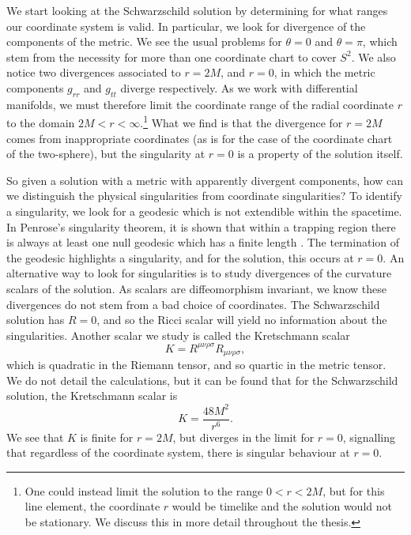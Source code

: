 We start looking at the Schwarzschild solution by determining for what ranges our coordinate system is valid. In particular, we look for divergence of the components of the metric. We see the usual problems for $\theta = 0$ and $\theta = \pi$, which stem from the necessity for more than one coordinate chart to cover $S^2$. We also notice two divergences associated to $r = 2M$, and $r = 0$, in which the metric components $g_{rr}$ and $g_{tt}$ diverge respectively. As we work with differential manifolds, we must therefore limit the coordinate range of the radial coordinate $r$ to the domain $2M < r  < \infty$.\footnote{One could instead limit the solution to the range $0 < r < 2M$, but for this line element, the coordinate $r$ would be timelike and the solution would not be stationary. We discuss this in more detail throughout the thesis.} What we find is that the divergence for $r = 2M$ comes from inappropriate coordinates (as is for the case of the coordinate chart of the two-sphere), but the singularity at $r = 0$ is a property of the solution itself.

So given a solution with a metric with apparently divergent components, how can we distinguish the physical singularities from coordinate singularities? To identify a singularity, we look for a geodesic which is not extendible within the spacetime. In Penrose's singularity theorem, it is shown that within a trapping region there is always at least one null geodesic which has a finite length \cite{Penrose:1964wq}. The termination of the geodesic highlights a singularity, and for the \sch solution, this occurs at $r = 0$. An alternative way to look for singularities is to study divergences of the curvature scalars of the solution. As scalars are diffeomorphism invariant, we know these divergences do not stem from a bad choice of coordinates. The Schwarzschild solution has $R = 0$, and so the Ricci scalar will yield no information about the singularities. Another scalar we study is called the Kretschmann scalar
\begin{equation}
\label{eq:kretschmann}
	K = R^{\mu \nu \rho \sigma} R_{\mu \nu \rho \sigma},
\end{equation}  
which is quadratic in the Riemann tensor, and so quartic in the metric tensor. We do not detail the calculations, but it can be found \cite{Henry:1999rm} that for the Schwarzschild solution, the Kretschmann scalar is
\begin{equation*}
	K = \frac{48 M^2}{r^6}.
\end{equation*}
We see that $K$ is finite for $r = 2M$, but diverges in the limit for $r = 0$, signalling that regardless of the coordinate system, there is singular behaviour at $r = 0$. 

